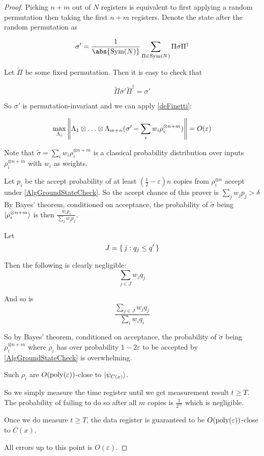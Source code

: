 \begin{proof}
	Picking $n+m$ out of $N$ registers is equivalent to first applying a random permutation then taking the first $n+m$ registers. Denote the state after the random permutation as

	$$\sigma'=\frac{1}{\abs{\Sym(N)}}\sum_{\Pi\in\Sym(N)}\Pi\sigma\Pi^\dagger$$

	Let $\tilde{\Pi}$ be some fixed permutation. Then it is easy to check that

	$$\tilde{\Pi}\sigma'\tilde{\Pi}^\dagger=\sigma'$$

	So $\sigma'$ is permutation-invariant and we can apply \autoref{deFinetti}:

	$$\max_{\Lambda_i}\left\lVert\Lambda_1\otimes\ldots\otimes\Lambda_{m+n}(\sigma'-\sum_i w_i\rho_i^{\otimes n+m})\right\rVert=O(\varepsilon)$$

	Note that $\tilde\sigma=\sum_i w_i\rho_i^{\otimes n+m}$ is a classical probability distribution over inputs $\rho_i^{\otimes n+m}$ with $w_i$ as weights.

	Let $p_i$ be the accept probability of at least $(\frac{1}{2}-\varepsilon)n$ copies from $\rho_i^{\otimes n}$ accept under \autoref{AlgGroundStateCheck}.
	So the accept chance of this prover is $\sum_j w_j p_j>\delta$
	By Bayes' theorem, conditioned on acceptance, the probability of $\tilde{\sigma}$ being $\ket{\rho_i^{\otimes n+m}}$ is then $\frac{w_i p_i}{\sum_j w_j p_j}$.

	Let
	$$J=\set{j:q_j\leq q'}$$

	Then the following is clearly negligible:
	$$\sum_{j\in J} w_j q_j$$

	And so is
	$$\frac{\sum_{j\in J} w_j q_j}{\sum_i w_i q_i}$$

	So by Bayes' theorem, conditioned on acceptance, the probability of $\tilde{\sigma}$ being $\rho_i^{\otimes n+m}$ where $\rho_i$ has over probability $1-2\varepsilon$ to be accepted by \autoref{AlgGroundStateCheck} is overwhelming.

	Such $\rho_i$ are $O(\operatorname*{\operatorname{poly}}(\varepsilon))$-close to $\ket{\psi_{C(x)}}$.

	So we simply measure the time register until we get measurement result $t\geq T$. The probability of failing to do so after all $m$ copies is $\frac{1}{2^m}$ which is negligible.
	
	Once we do measure $t\geq T$, the data register is guaranteed to be $O(\operatorname*{\operatorname{poly}}(\varepsilon))$-close to $C(x)$.

	All errors up to this point is $O(\varepsilon)$.

\end{proof}
